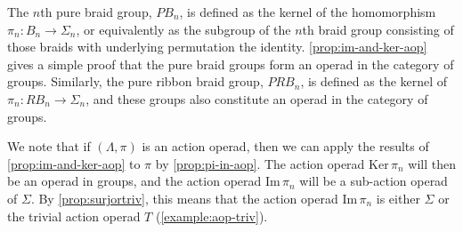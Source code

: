 \begin{example}\label{ex:pure-braids}
The $n$th pure braid group, $PB_n$, is defined as the kernel of the homomorphism $\pi_n \colon B_n \to \Sigma_n$, or equivalently as the subgroup of the $n$th braid group consisting of those braids with underlying permutation the identity.
\cref{prop:im-and-ker-aop} gives a simple proof that the pure braid groups form an operad in the category of groups.
Similarly, the pure ribbon braid group, $PRB_n$, is defined as the kernel of $\pi_n \colon RB_n \to \Sigma_n$, and these groups also constitute an operad in the category of groups.

\end{example}

\begin{rem}\label{rem:im-and-ker-Sigma}
We note that if $(\Lambda, \pi)$ is an action operad, then we can apply the results of \cref{prop:im-and-ker-aop} to $\pi$ by \cref{prop:pi-in-aop}.
The action operad $\mathrm{Ker}\,\pi_n$ will then be an operad in groups, and the action operad $\mathrm{Im}\,\pi_n$ will be a sub-action operad of $\Sigma$.
By \cref{prop:surjortriv}, this means that the action operad $\mathrm{Im}\,\pi_n$ is either $\Sigma$ or the trivial action operad $T$ (\cref{example:aop-triv}).
\end{rem}

%

